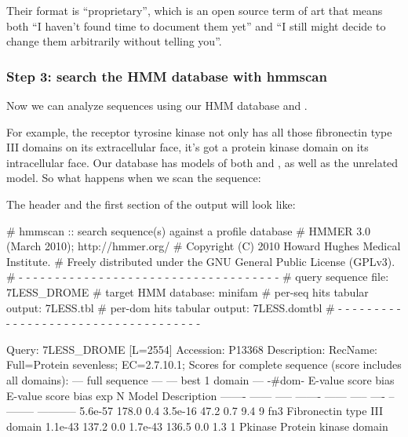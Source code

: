 Their format is ``proprietary'', which is an open source term of art
that means both ``I haven't found time to document them yet'' and ``I
still might decide to change them arbitrarily without telling you''.


\subsubsection{Step 3: search the HMM database with hmmscan}

Now we can analyze sequences using our HMM database and
. 

For example, the receptor tyrosine kinase  not only
has all those fibronectin type III domains on its extracellular face,
it's got a protein kinase domain on its intracellular face. Our
 database has models of both  and
, as well as the unrelated  model. So
what happens when we scan the  sequence:


The header and the first section of the output will look like:

\begin{sreoutput}
# hmmscan :: search sequence(s) against a profile database
# HMMER 3.0 (March 2010); http://hmmer.org/
# Copyright (C) 2010 Howard Hughes Medical Institute.
# Freely distributed under the GNU General Public License (GPLv3).
# - - - - - - - - - - - - - - - - - - - - - - - - - - - - - - - - - - - -
# query sequence file:             7LESS_DROME
# target HMM database:             minifam
# per-seq hits tabular output:     7LESS.tbl
# per-dom hits tabular output:     7LESS.domtbl
# - - - - - - - - - - - - - - - - - - - - - - - - - - - - - - - - - - - -

Query:       7LESS_DROME  [L=2554]
Accession:   P13368
Description: RecName: Full=Protein sevenless;          EC=2.7.10.1;
Scores for complete sequence (score includes all domains):
   --- full sequence ---   --- best 1 domain ---    -#dom-
    E-value  score  bias    E-value  score  bias    exp  N  Model    Description
    ------- ------ -----    ------- ------ -----   ---- --  -------- -----------
    5.6e-57  178.0   0.4    3.5e-16   47.2   0.7    9.4  9  fn3      Fibronectin type III domain
    1.1e-43  137.2   0.0    1.7e-43  136.5   0.0    1.3  1  Pkinase  Protein kinase domain
\end{sreoutput}

